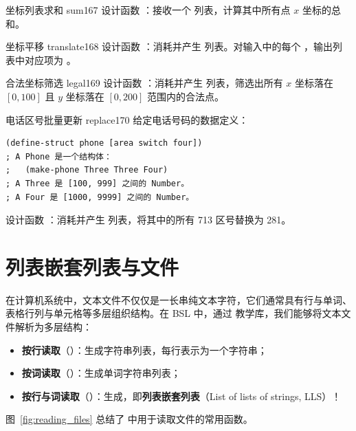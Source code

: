 \begin{exercise}{坐标列表求和 sum}{167}
设计函数 ：接收一个  列表，计算其中所有点 $x$ 坐标的总和。
\end{exercise}

\begin{exercise}{坐标平移 translate}{168}
设计函数 ：消耗并产生  列表。对输入中的每个 ，输出列表中对应项为 。
\end{exercise}

\begin{exercise}{合法坐标筛选 legal}{169}
设计函数 ：消耗并产生  列表，筛选出所有 $x$ 坐标落在 $[0, 100]$ 且 $y$ 坐标落在 $[0, 200]$ 范围内的合法点。
\end{exercise}

\begin{exercise}{电话区号批量更新 replace}{170}
给定电话号码的数据定义：
\begin{lstlisting}[language=BSL]
(define-struct phone [area switch four])
; A Phone 是一个结构体：
;   (make-phone Three Three Four)
; A Three 是 [100, 999] 之间的 Number。
; A Four 是 [1000, 9999] 之间的 Number。
\end{lstlisting}
设计函数 ：消耗并产生  列表，将其中的所有 713 区号替换为 281。
\end{exercise}

\section{列表嵌套列表与文件}
\label{sec:ch10_lists_in_lists_files}

在计算机系统中，文本文件不仅仅是一长串纯文本字符，它们通常具有行与单词、表格行列与单元格等多层组织结构。在 BSL 中，通过  教学库，我们能够将文本文件解析为多层结构：
\begin{itemize}
  \item \textbf{按行读取}（）：生成字符串列表，每行表示为一个字符串；
  \item \textbf{按词读取}（）：生成单词字符串列表；
  \item \textbf{按行与词读取}（）：生成，即\textbf{列表嵌套列表}（List of lists of strings, LLS）！
\end{itemize}

图~\ref{fig:reading_files} 总结了  中用于读取文件的常用函数。

